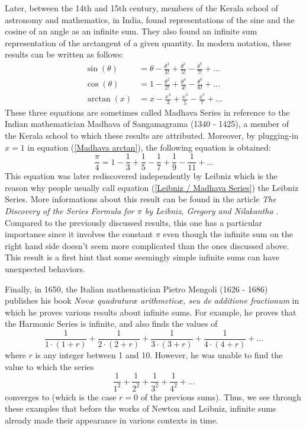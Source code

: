 Later, between the 14th and 15th century, members of the Kerala school of astronomy and mathematics, in India, found representations of the sine and the cosine of an angle as an infinite sum. They also found an infinite sum representation of the arctangent of a given quantity. In modern notation, these results can be written as follows:
\begin{align}
    \sin(\theta) &= \theta - \frac{\theta^3}{3!} + \frac{\theta^5}{5!} - \frac{\theta^7}{7!} + \dots \\
    \cos(\theta) &= 1 - \frac{\theta^2}{2!} + \frac{\theta^4}{4!} - \frac{\theta^6}{6!} + \dots \\
    \arctan(x) &= x - \frac{x^3}{3} + \frac{x^5}{5} - \frac{x^7}{7} + \dots \label{Madhava arctan}
\end{align}
These three equations are sometimes called Madhava Series in reference to the Indian mathematician Madhava of Sangamagrama (1340 - 1425), a member of the Kerala school to which these results are attributed. Moreover, by plugging-in $x=1$ in equation (\ref{Madhava arctan}), the following equation is obtained:
\begin{equation} \label{Leibniz / Madhava Series}
    \frac{\pi}{4} = 1 - \frac{1}{3} + \frac{1}{5} - \frac{1}{7} + \frac{1}{9} - \frac{1}{11} + \dots
\end{equation}
This equation was later rediscovered independently by Leibniz which is the reason why people usually call equation (\ref{Leibniz / Madhava Series}) the Leibniz Series. More informations about this result can be found in the article \textit{The Discovery of the Series Formula for $\pi$ by Leibniz, Gregory and Nilakantha} \cite{LeibnizMadhavaSeries}. Compared to the previously discussed results, this one has a particular importance since it involves the constant $\pi$ even though the infinite sum on the right hand side doesn't seem more complicated than the ones discussed above. This result is a first hint that some seemingly simple infinite sums can have unexpected behaviors.

Finally, in 1650, the Italian mathematician Pietro Mengoli (1626 - 1686) publishes his book \textit{Novæ quadraturæ arithmeticæ, seu de additione fractionum} \cite{mengoli1650nouæ} in which he proves various results about infinite sums. For example, he proves that the Harmonic Series is infinite, and also finds the values of
$$\frac{1}{1\cdot(1 + r)} + \frac{1}{2\cdot(2 + r)} + \frac{1}{3\cdot(3 + r)} + \frac{1}{4\cdot(4 + r)} + \dots$$
where $r$ is any integer between 1 and 10. However, he was unable to find the value to which the series
$$\frac{1}{1^2} + \frac{1}{2^2} + \frac{1}{3^2} + \frac{1}{4^2} + \dots$$
converges to (which is the case $r=0$ of the previous sums). Thus, we see through these examples that before the works of Newton and Leibniz, infinite sums already made their appearance in various contexts in time.

